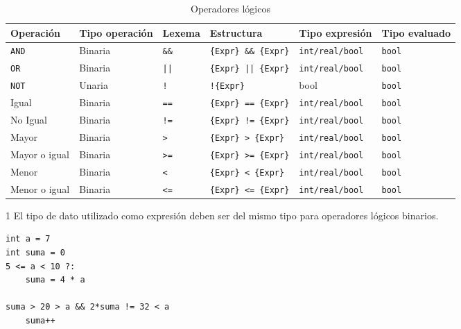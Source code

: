 \documentclass[11pt, english]{article}
\begin{document}
\begin{table}[H]
	\begin{center}
		\caption{Operadores lógicos}\label{tab:logic-operators}
		\begin{threeparttable}
			\begin{tabular}{l|lllll}
				\toprule
				\textbf{Operación} & \textbf{Tipo operación} & \textbf{Lexema} & \textbf{Estructura} & \textbf{Tipo expresión}\tnote{1} & \textbf{Tipo evaluado}\\
				\midrule
				\texttt{AND} & Binaria & \texttt{\&\&} & \texttt{\{Expr\} \&\& \{Expr\}} & \texttt{int/real/bool} & \texttt{bool}\\
				\texttt{OR} & Binaria & \texttt{||} & \texttt{\{Expr\} || \{Expr\}} & \texttt{int/real/bool} & \texttt{bool}\\
				\texttt{NOT} & Unaria & \texttt{!} & \texttt{!\{Expr\}} & bool & \texttt{bool}\\
				Igual & Binaria & \texttt{==} & \texttt{\{Expr\} == \{Expr\}} & \texttt{int/real/bool} & \texttt{bool}\\
				No Igual & Binaria & \texttt{!=} & \texttt{\{Expr\} != \{Expr\}} & \texttt{int/real/bool} & \texttt{bool}\\
				Mayor & Binaria & \texttt{>} & \texttt{\{Expr\} > \{Expr\}} & \texttt{int/real/bool} & \texttt{bool}\\
				Mayor o igual & Binaria & \texttt{>=} & \texttt{\{Expr\} >= \{Expr\}} & \texttt{int/real/bool} & \texttt{bool}\\
				Menor & Binaria & \texttt{<} & \texttt{\{Expr\} < \{Expr\}} & \texttt{int/real/bool} & \texttt{bool}\\
				Menor o igual & Binaria & \texttt{<=} & \texttt{\{Expr\} <= \{Expr\}} & \texttt{int/real/bool} & \texttt{bool}\\
				\bottomrule
			\end{tabular}
			\begin{tablenotes}
				\small
				\item[1] El tipo de dato utilizado como expresión deben ser del mismo tipo para operadores lógicos binarios.
			\end{tablenotes}
		\end{threeparttable}
	\end{center}
\end{table}

\begin{lstlisting}[caption=Ejemplo de uso los operadores lógicos]
int a = 7
int suma = 0
5 <= a < 10 ?:
	suma = 4 * a

suma > 20 > a && 2*suma != 32 < a
	suma++
\end{lstlisting}
\end{document}
